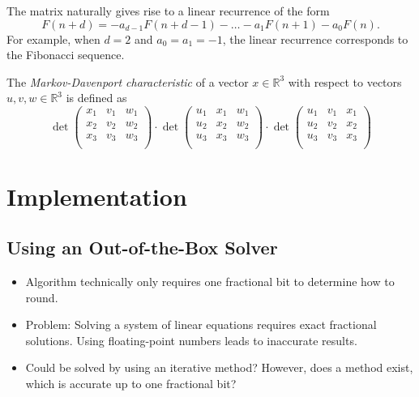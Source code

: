 \documentclass[english,version-2020-11]{uzl-thesis}
\begin{document}
The matrix naturally gives rise to a linear recurrence of the form
\[
  F(n + d) = -a_{d-1} F(n + d - 1) - \dots - a_1 F(n + 1) - a_0 F(n).
\]
For example, when $d = 2$ and $a_0 = a_1 = -1$, the linear recurrence
corresponds to the Fibonacci sequence.

\begin{definition}
  The \emph{Markov-Davenport characteristic} of a vector $x ∈ ℝ^3$ with respect to vectors $u, v, w ∈ ℝ^3$
  is defined as
  \[
    \det
    \begin{pmatrix}
      x_1 & v_1 & w_1 \\
      x_2 & v_2 & w_2 \\
      x_3 & v_3 & w_3 \\
    \end{pmatrix}
    · \det
    \begin{pmatrix}
      u_1 & x_1 & w_1 \\
      u_2 & x_2 & w_2 \\
      u_3 & x_3 & w_3 \\
    \end{pmatrix}
    · \det
    \begin{pmatrix}
      u_1 & v_1 & x_1 \\
      u_2 & v_2 & x_2 \\
      u_3 & v_3 & x_3 \\
    \end{pmatrix}
  \]
\end{definition}


\chapter{Implementation}


\section{Using an Out-of-the-Box Solver}

\begin{itemize}
  \item Algorithm technically only requires one fractional bit to determine how to round.
  \item Problem: Solving a system of linear equations requires exact fractional solutions.
    Using floating-point numbers leads to inaccurate results.
  \item Could be solved by using an iterative method? However, does a method
    exist, which is accurate up to one fractional bit?
\end{itemize}
\end{document}
